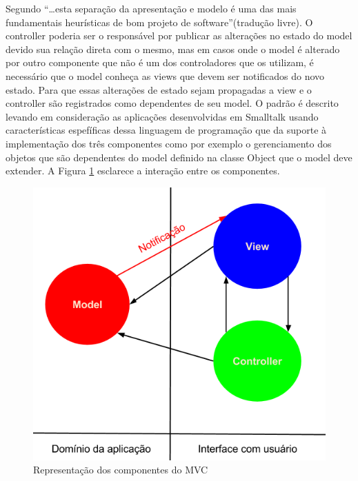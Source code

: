 Segundo  ``\ldots esta separação da
apresentação e modelo é uma das mais fundamentais heurísticas de bom projeto
de software''(tradução livre).
O controller poderia ser o responsável por publicar as alterações no estado do
model devido sua relação direta com o mesmo, mas em casos onde o model é
alterado por outro componente que não é um dos controladores que os utilizam, é
necessário que o model conheça as views que devem ser notificados do novo
estado. Para que essas alterações de estado sejam propagadas a view e o
controller são registrados como dependentes de seu model. O padrão é descrito
levando em consideração as aplicações desenvolvidas em Smalltalk usando
características espefíficas dessa linguagem de programação que da suporte à
implementação dos três componentes como por exemplo o gerenciamento dos objetos
que são dependentes do model definido na classe Object que o model deve
extender. A Figura \ref{mvc} esclarece a interação entre os componentes.

\begin{figure}[htb]
	\caption{\label{mvc}Representação dos componentes do MVC}
	\begin{center}
		\includegraphics[scale=0.5]{img/mvc.png}
	\end{center}
\end{figure}

